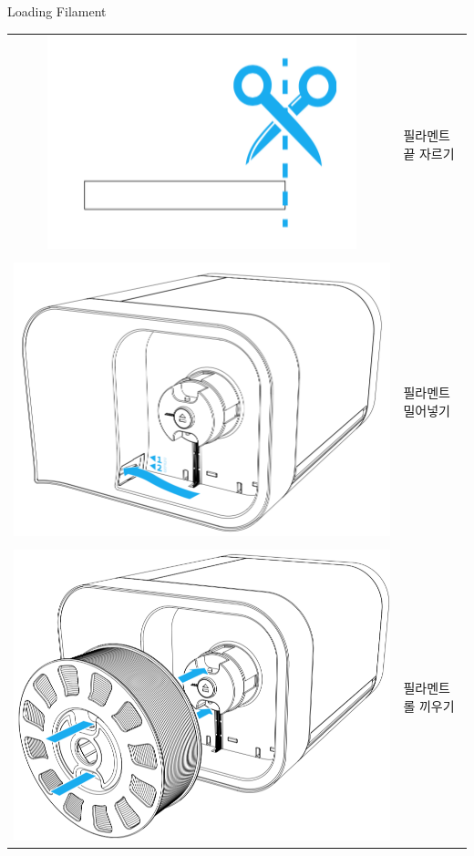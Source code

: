 \documentclass[11pt]{beamer}
\begin{document}
\begin{frame}[t]{Loading Filament}\footnotesize
\begin{tabular}{c l}
\includegraphics[width=0.2\textheight]{./image/17_09.png}&필라멘트 끝 자르기\\ &\\
\includegraphics[width=0.35\textheight]{./image/17_10.png}&필라멘트 밀어넣기 \\ &\\
\includegraphics[width=0.35\textheight]{./image/17_11.png}&필라멘트롤 끼우기 \\ 
\end{tabular}
\end{frame}
\end{document}
